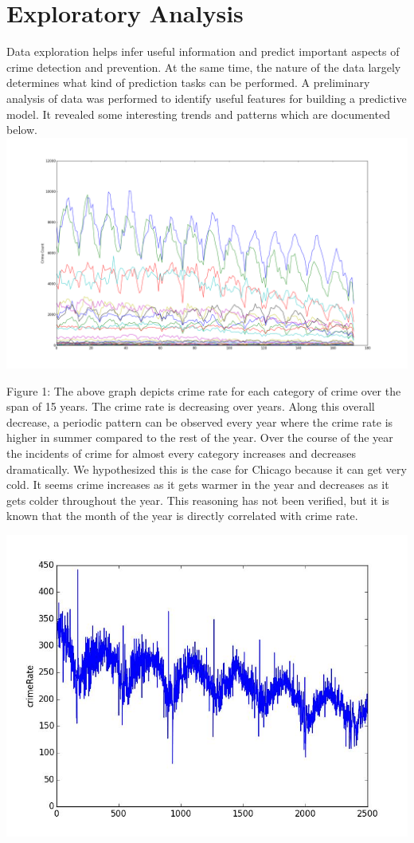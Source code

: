 \documentclass[journal]{IEEEtran}
\begin{document}
\section{Exploratory Analysis}
Data exploration helps infer useful information and predict important aspects of crime detection and prevention. At the same time, the nature of the data largely determines what kind of prediction tasks can be performed. A preliminary analysis of data was performed to identify useful features for building a predictive model. It revealed some interesting trends and patterns which are documented below.
\includegraphics[scale = 0.17]{Crime/Month.png}

Figure 1: The above graph depicts crime rate for each category of crime over the span of 15 years. The crime rate is decreasing over years. Along this overall decrease, a periodic pattern can be observed every year where the crime rate is higher in summer compared to the rest of the year. 
Over the course of the year the incidents of crime for almost every category increases and decreases dramatically. We hypothesized this is the case for Chicago because it can get very cold. It seems crime increases as it gets warmer in the year and decreases as it gets colder throughout the year. This reasoning has not been verified, but it is known that the month of the year is directly correlated with crime rate. 

\includegraphics[scale = 0.27]{Crime/Day.jpg}
\end{document}
